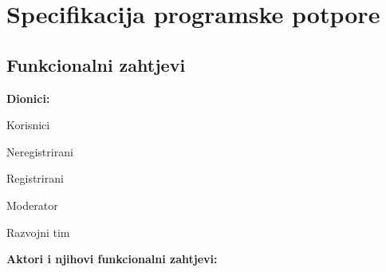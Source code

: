 \chapter{Specifikacija programske potpore}
		
	\section{Funkcionalni zahtjevi}			
			
			\noindent \textbf{Dionici:}
			
			\begin{packed_enum}
				
				\item Korisnici
					\begin{packed_enum}
						\item  Neregistrirani
						\item  Registrirani
					\end{packed_enum}
				\item Moderator
				\item Razvojni tim
				
			\end{packed_enum}
			
			\noindent \textbf{Aktori i njihovi funkcionalni zahtjevi:}
			
